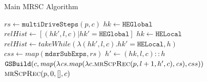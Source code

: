 \documentclass[submission,copyright,creativecommons]{eptcs}
\begin{document}
\begin{algorithm}[H]
  \caption{Main MRSC Algorithm}
  \label{alg:MRSCAlg}
  \begin{algorithmic}[1]
      \State {}
        \State {}
      \Else
        \State $\mathit{rs} \gets \mathtt{multiDriveSteps}(p, c)$
          \State $\mathit{hk} \gets \mathtt{HEGlobal}$
          \State $\mathit{relHist} \gets [ (\mathit{hk}', l, c) | \mathit{hk}' = \mathtt{HEGlobal} ]$
        \Else
          \State $\mathit{hk} \gets \mathtt{HELocal}$
          \State $\mathit{relHist} \gets \mathit{takeWhile}(\lambda (\mathit{hk}', l, c) . \mathit{hk}' = \mathtt{HELocal}, h)$
        \EndIf
          \State {}
        \Else
          \State $\mathit{css} \gets \mathit{map}(\mathtt{mdsrSubExps}, \mathit{rs})$
          \State $h' \gets (\mathit{hk}, l, c)::h$
          \State \Return $\mathtt{GSBuild}(c, \mathit{map}(\lambda \mathit{cs} . \mathit{map}(\lambda c . \Call{mrScpRec}{p, l+1, h', c}, \mathit{cs}) , css))$
        \EndIf
      \EndIf
    \EndFunction
      \State \Return $\Call{mrScpRec}{p, 0, [], c}$
    \EndFunction
  \end{algorithmic}
\end{algorithm}
\end{document}
